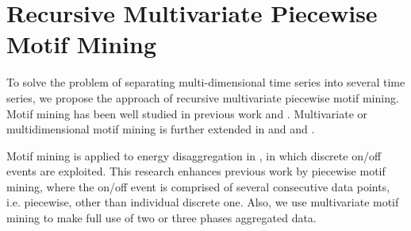 \section{Recursive Multivariate Piecewise Motif Mining}
To solve the problem of separating multi-dimensional time series into several time series, 
we propose the approach of recursive multivariate piecewise motif mining. 
Motif mining has been well studied in previous work \cite{motif1} and \cite{motif2}. 
Multivariate or multidimensional motif mining is further extended in \cite{minnen2007improving} and \cite{tanaka2005discovery} and \cite{motifgoal}. 

Motif mining is applied to energy disaggregation in \cite{shao2013temporal}, 
in which discrete on/off events are exploited. 
This research enhances previous work by piecewise motif mining, 
where the on/off event is comprised of several consecutive data points, 
i.e. piecewise, other than individual discrete one.
Also, we use multivariate motif mining to make full use of two or three phases aggregated data. 

